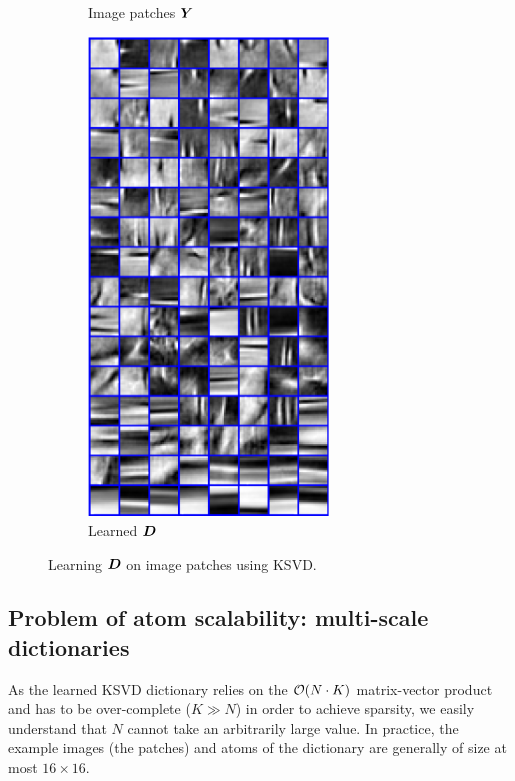 \begin{figure}[!ht]
\begin{subfigure}[b]{0.29\textwidth}
	\caption{Image patches $\bm{Y}$}\label{fig_ksvd_patches}
\end{subfigure}
\begin{subfigure}[b]{0.29\textwidth}\centering
	\includegraphics[width=0.7\textwidth]{figures/ksvd/dictionary.pdf}
	\caption{Learned $\bm{D}$}\label{fig_ksvd_dict}
\end{subfigure}
\caption{Learning $\bm{D}$ on image patches using \ac{KSVD}.}\label{fig_ksvd}
\end{figure}


\subsection{Problem of atom scalability: multi-scale dictionaries}
As the learned \ac{KSVD} dictionary relies on the $\mathcal{O}(N \cdot K)$ matrix-vector product and has to be over-complete ($K \gg N$) in order to achieve sparsity, we easily understand that $N$ cannot take an arbitrarily large value. In practice, the example images (the patches) and atoms of the dictionary are generally of size at most $16 \times 16$.

